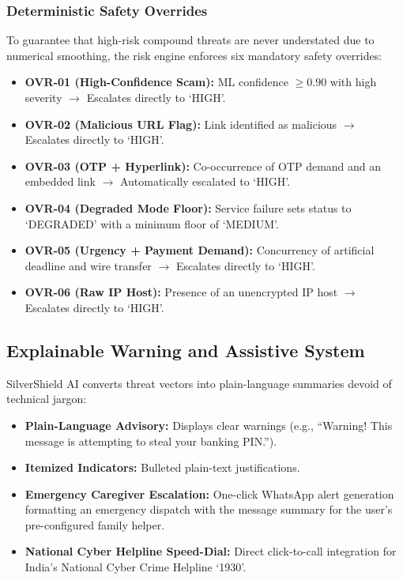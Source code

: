 \documentclass[conference]{IEEEtran}
\begin{document}
\subsubsection{Deterministic Safety Overrides}
To guarantee that high-risk compound threats are never understated due to numerical smoothing, the risk engine enforces six mandatory safety overrides:
\begin{itemize}
    \item \textbf{OVR-01 (High-Confidence Scam):} ML confidence $\ge 0.90$ with high severity $\to$ Escalates directly to `HIGH'.
    \item \textbf{OVR-02 (Malicious URL Flag):} Link identified as malicious $\to$ Escalates directly to `HIGH'.
    \item \textbf{OVR-03 (OTP + Hyperlink):} Co-occurrence of OTP demand and an embedded link $\to$ Automatically escalated to `HIGH'.
    \item \textbf{OVR-04 (Degraded Mode Floor):} Service failure sets status to `DEGRADED' with a minimum floor of `MEDIUM'.
    \item \textbf{OVR-05 (Urgency + Payment Demand):} Concurrency of artificial deadline and wire transfer $\to$ Escalates directly to `HIGH'.
    \item \textbf{OVR-06 (Raw IP Host):} Presence of an unencrypted IP host $\to$ Escalates directly to `HIGH'.
\end{itemize}

\subsection{Explainable Warning and Assistive System}
SilverShield AI converts threat vectors into plain-language summaries devoid of technical jargon:
\begin{itemize}
    \item \textbf{Plain-Language Advisory:} Displays clear warnings (e.g., ``Warning! This message is attempting to steal your banking PIN.'').
    \item \textbf{Itemized Indicators:} Bulleted plain-text justifications.
    \item \textbf{Emergency Caregiver Escalation:} One-click WhatsApp alert generation formatting an emergency dispatch with the message summary for the user's pre-configured family helper.
    \item \textbf{National Cyber Helpline Speed-Dial:} Direct click-to-call integration for India's National Cyber Crime Helpline `1930'.
\end{itemize}
\end{document}

